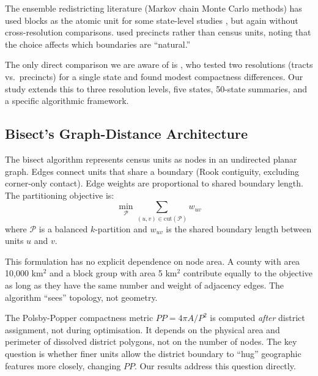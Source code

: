The ensemble redistricting literature (Markov chain Monte Carlo methods) has
used blocks as the atomic unit for some state-level studies
\citep{duchin2020gerrymandering}, but again without cross-resolution
comparisons.  \citet{magleby2018new} used precincts rather than census units,
noting that the choice affects which boundaries are ``natural.''

The only direct comparison we are aware of is \citet{moody2019}, who tested
two resolutions (tracts vs.\ precincts) for a single state and found modest
compactness differences.  Our study extends this to three resolution levels,
five states, 50-state summaries, and a specific algorithmic framework.

\subsection{Bisect's Graph-Distance Architecture}

The bisect algorithm represents census units as nodes in an undirected
planar graph.  Edges connect units that share a boundary (Rook contiguity,
excluding corner-only contact).  Edge weights are proportional to shared
boundary length.  The partitioning objective is:
\begin{equation}
  \min_{\mathcal{P}} \sum_{(u,v) \in \text{cut}(\mathcal{P})} w_{uv}
\end{equation}
where $\mathcal{P}$ is a balanced $k$-partition and $w_{uv}$ is the shared
boundary length between units $u$ and $v$.

This formulation has no explicit dependence on node area.  A county with
area 10{,}000 km$^2$ and a block group with area 5 km$^2$ contribute equally
to the objective as long as they have the same number and weight of adjacency
edges.  The algorithm ``sees'' topology, not geometry.

The Polsby-Popper compactness metric $PP = 4\pi A / P^2$ is computed
\emph{after} district assignment, not during optimisation.  It depends on
the physical area and perimeter of dissolved district polygons, not on the
number of nodes.  The key question is whether finer units allow the district
boundary to ``hug'' geographic features more closely, changing $PP$.  Our
results address this question directly.
